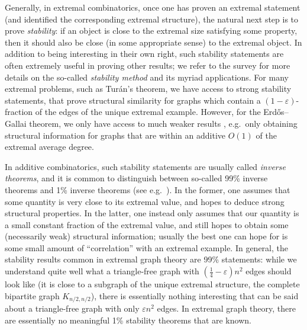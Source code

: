 \documentclass[10pt]{article}
\theoremstyle{definition}
\begin{document}
Generally, in extremal combinatorics, once one has proven an extremal statement (and identified the corresponding extremal structure), the natural next step is to prove \emph{stability}: if an object is close to the extremal size satisfying some property, then it should also be {close} (in some appropriate sense) to the extremal object. In addition to being interesting in their own right, such stability statements are often extremely useful in proving other results; we refer to the survey \cite[Section 5]{MR2866732} for more details on the so-called \emph{stability method} and its myriad applications. For many extremal problems, such as Tur\'an's theorem, we have access to strong stability statements, that prove structural similarity for graphs which contain a $(1-\varepsilon)$-fraction of the edges of the unique extremal example. However, for the Erd\H os--Gallai theorem, we only have access to much weaker results \cite{MR4078813,MR3548292,MR3777040}, e.g.\ only obtaining structural information for graphs that are within an additive $O(1)$ of the extremal average degree.

In additive combinatorics, such stability statements are usually called \emph{inverse theorems}, and it is common to distinguish between so-called 99\% inverse theorems and 1\% inverse theorems (see e.g.\ \cite[Section 1.5]{MR2931680}). In the former, one assumes that some quantity is very close to its extremal value, and hopes to deduce strong structural properties. In the latter, one instead only assumes that our quantity is a small constant fraction of the extremal value, and still hopes to obtain some (necessarily weak) structural information; usually the best one can hope for is some small amount of ``correlation'' with an extremal example. In general, the stability results common in extremal graph theory are 99\% statements: while we understand quite well what a triangle-free graph with $(\frac 14-\varepsilon)n^2$ edges should look like (it is close to a subgraph of the unique extremal structure, the complete bipartite graph $K_{n/2,n/2}$), there is essentially nothing interesting that can be said about a triangle-free graph with only $\varepsilon n^2$ edges. In extremal graph theory, there are essentially no meaningful 1\% stability theorems that are known. 
\end{document}
